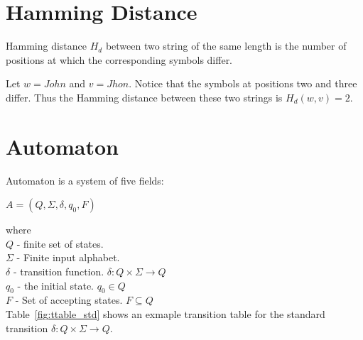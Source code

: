 \documentclass{mini}
\begin{document}
\section{Hamming Distance} \label{sec:hamming}

\begin{definition}
Hamming distance $H_d$ between two string of the same length is the number of positions at which the corresponding symbols differ.
\end{definition}

\begin{example} 
Let $w = John$ and $v = Jhon$. Notice that the symbols at positions two and three differ. Thus the Hamming distance between these two strings is $H_d(w,v) = 2$.
\end{example}


\section{Automaton} \label{sec:autom}
Automaton is a system of five fields:
\begin{center}
    $A = (Q, \Sigma, \delta, q_0, F)$
\end{center}

where \\
$Q$ - finite set of states. \\
$\Sigma$ - Finite input alphabet. \\
$\delta$ - transition function. $\delta: Q \times \Sigma \rightarrow Q$ \\
$q_0$ - the initial state. $q_0 \in Q$ \\
$F$ - Set of accepting states. $F \subseteq Q$ \\

Table~\ref{fig:ttable_std} shows an exmaple transition table for the standard transition $\delta: Q \times \Sigma \rightarrow Q$.
\end{document}
